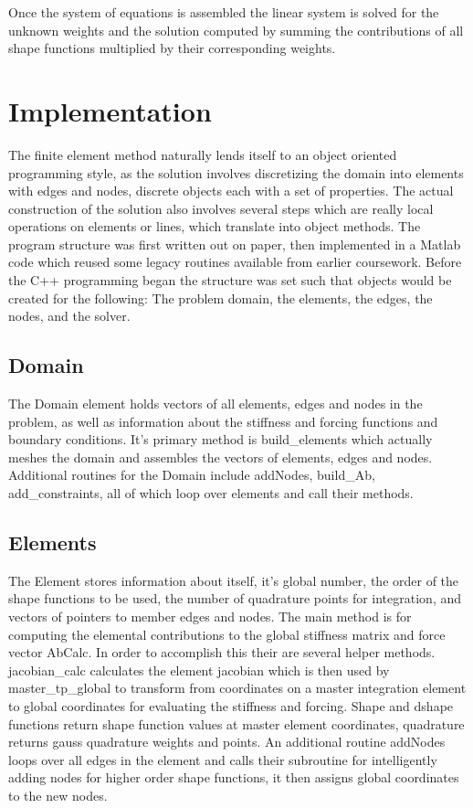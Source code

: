 \documentclass[12pt]{article}
\begin{document}
Once the system of equations is assembled the linear system is solved for the unknown weights and the solution computed by summing the contributions of all shape functions multiplied by their corresponding weights.

\section*{Implementation}

The finite element method naturally lends itself to an object oriented programming style, as the solution involves discretizing the domain into elements with edges and nodes, discrete objects each with a set of properties.  The actual construction of the solution also involves several steps which are really local operations on elements or lines, which translate into object methods.  The program structure was first written out on paper, then implemented in a Matlab code which reused some legacy routines available from earlier coursework.  Before the C++ programming began the structure was set such that objects would be created for the following: The problem domain, the elements, the edges, the nodes, and the solver.

\subsection*{Domain}

The Domain element holds vectors of all elements, edges and nodes in the problem, as well as information about the stiffness and forcing functions and boundary conditions.  It's primary method is build\_elements which actually meshes the domain and assembles the vectors of elements, edges and nodes.  Additional routines for the Domain include addNodes, build\_Ab, add\_constraints, all of which loop over elements and call their methods.

\subsection*{Elements}

The Element stores information about itself, it's global number, the order of the shape functions to be used, the number of quadrature points for integration, and vectors of pointers to member edges and nodes.  The main method is for computing the elemental contributions to the global stiffness matrix and force vector AbCalc.  In order to accomplish this their are several helper methods.  jacobian\_calc calculates the element jacobian which is then used by master\_tp\_global to transform from coordinates on a master integration element to global coordinates for evaluating the stiffness and forcing.  Shape and dshape functions return shape function values at master element coordinates, quadrature returns gauss quadrature weights and points.  An additional routine addNodes loops over all edges in the element and calls their subroutine for intelligently adding nodes for higher order shape functions, it then assigns global coordinates to the new nodes.
\end{document}

